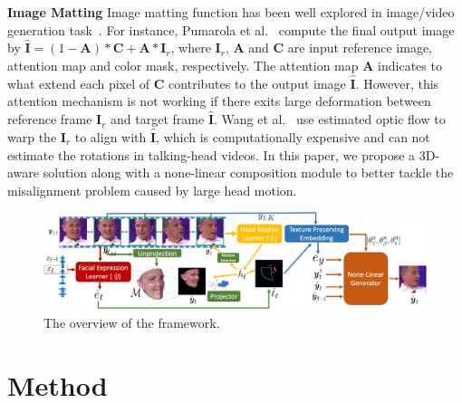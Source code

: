 \documentclass[runningheads]{llncs}
\begin{document}
\noindent \textbf{ Image Matting} \quad  Image matting function has been well explored in image/video generation task~\cite{vondrick2016generating,wang2018vid2vid,pumarola2019ganimation,chen2019hierarchical,wang2018fewshotvid2vid}. For instance, Pumarola et al.~\cite{pumarola2019ganimation} compute the final output image by $\hat{\mathbf{I}} = (1 - \mathbf{A}) * \mathbf{C} + \mathbf{A} * \mathbf{I}_r $, where $\mathbf{I}_r$, $\mathbf{A}$ and $\mathbf{C}$ are input reference image, attention map and color mask, respectively. The attention map $\mathbf{A}$ indicates to what extend each pixel of $\mathbf{C}$ contributes to the output image $\hat{\mathbf{I}}$. However, this attention mechanism is not working if there exits large deformation between reference frame $\mathbf{I}_r$ and target frame $\hat{\mathbf{I}}$. Wang et al.~\cite{wang2018high} use estimated optic flow to warp the $\mathbf{I}_r$ to align with $\hat{\mathbf{I}}$, which is computationally expensive and can not estimate the rotations in talking-head videos. In this paper, we propose a 3D-aware solution along with a none-linear composition module to better tackle the misalignment problem caused by large head motion. 

\begin{figure}[t]
\includegraphics[width=1.0 \linewidth]{latex/images/main.pdf}
\caption{The overview of the framework.}
\label{fig:main}
\end{figure}

\section{Method}
\label{sec:method}
\end{document}
